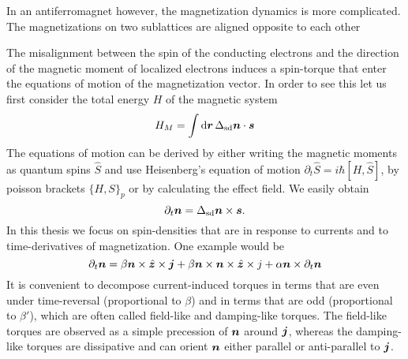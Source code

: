 In an antiferromagnet however, the magnetization dynamics is more complicated. The magnetizations on two sublattices are aligned opposite to each other 





The misalignment between the spin of the conducting electrons and the direction of the magnetic moment of localized electrons induces a spin-torque that enter the equations of motion of the magnetization vector. In order to see this let us first consider the total energy $H$ of the magnetic system
\begin{equation}
    H_M = \int \mathrm{d}\boldsymbol{r}\, \Delta_\text{sd} \boldsymbol{n}\cdot\boldsymbol{s}
\end{equation}
The equations of motion can be derived by either writing the magnetic moments as quantum spins $\hat{S}$ and use Heisenberg's equation of motion $\partial_t \hat{S} = i\hbar[H, \hat{S}]$, by poisson brackets $\{H,S\}_{p}$ or by calculating the effect field. We easily obtain
\begin{equation}
    \partial_t \boldsymbol{n} = \Delta_\text{sd}\boldsymbol{n}\times\boldsymbol{s}.
\end{equation}
In this thesis we focus on spin-densities that are in response to currents and to time-derivatives of magnetization. One example would be
\begin{equation}
    \partial_t \boldsymbol{n} = \beta \boldsymbol{n}\times \hat{\boldsymbol{z}}\times\boldsymbol{j} + \beta \boldsymbol{n}\times\boldsymbol{n}\times \hat{\boldsymbol{z}}\times{j} + \alpha \boldsymbol{n}\times \partial_t \boldsymbol{n}
\end{equation}
It is convenient to decompose current-induced torques in terms that are even under time-reversal (proportional to $\beta$) and in terms that are odd (proportional to $\beta'$), which are often called field-like and damping-like torques. The field-like torques are observed as a simple precession of $\boldsymbol{n}$ around $\boldsymbol{j}$, whereas the damping-like torques are dissipative and can orient $\boldsymbol{n}$ either parallel or anti-parallel to $\boldsymbol{j}$. 


